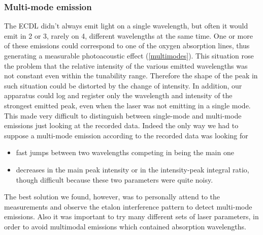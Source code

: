 \subsubsection{Multi-mode emission}
The ECDL didn't always emit light on a single wavelength, but often it would emit in 2 or 3, rarely on 4, different wavelengths at the same time. One or more of these emissions could correspond to one of the oxygen absorption lines, thus generating a measurable photoacoustic effect (\cref{multimodes}). This situation rose the problem that the relative intensity of the various emitted wavelengths was not constant even within the tunability range. Therefore the shape of the peak in such situation could be distorted by the change of intensity. In addition, our apparatus could log and register only the wavelength and intensity of the strongest emitted peak, even when the laser was not emitting in a single mode. This made very difficult to distinguish between single-mode and multi-mode emissions just looking at the recorded data. 
Indeed the only way we had to suppose a multi-mode emission according to the recorded data was looking for
\begin{itemize}
\item fast jumps between two wavelengths competing in being the main one
\item decreases in the main peak intensity or in the intensity-peak integral ratio, though difficult because these two parameters were quite noisy.
\end{itemize}
The best solution we found, however, was to personally attend to the measurements and observe the etalon interference pattern to detect multi-mode emissions. Also it was important to try many different sets of laser parameters, in order to avoid multimodal emissions which contained absorption wavelengths.


